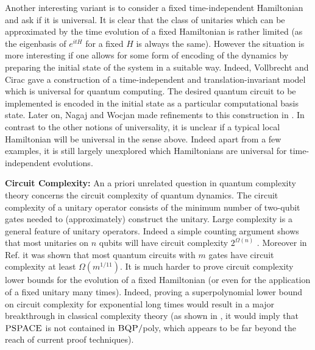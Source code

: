 \documentclass[11pt,letterpaper]{article}
\newcommand{\<}{\langle}
\renewcommand{\>}{\rangle}
\begin{document}
Another interesting variant is to consider a fixed time-independent Hamiltonian and ask if it is universal. It is clear that the class of unitaries which can be approximated by the time evolution of a fixed Hamiltonian is rather limited (as the eigenbasis of $e^{i t H}$ for a fixed $H$ is always the same). However the situation is more interesting if one allows for some form of encoding of the dynamics by preparing the initial state of the system in a suitable way. Indeed, Vollbrecht and Cirac \cite{VC} gave a construction of a time-independent and translation-invariant model which is universal for quantum computing. The desired quantum circuit to be implemented is encoded in the initial state as a particular computational basis state. Later on, Nagaj and Wocjan made refinements to this construction in \cite{NW}. In contrast to the other notions of universality, it is unclear if a typical local Hamiltonian will be universal in the sense above. Indeed apart from a few examples, it is still largely unexplored which Hamiltonians are universal for time-independent evolutions. 

\vspace{0.2 cm}

\noindent \textbf{Circuit Complexity:} An a priori unrelated question in quantum complexity theory concerns the circuit complexity of quantum dynamics. The circuit complexity of a unitary operator consists of the minimum number of two-qubit gates needed to (approximately) construct the unitary. Large complexity is a general feature of unitary operators. Indeed a simple counting argument shows that most unitaries on $n$ qubits will have circuit complexity $2^{\Omega(n)}$ \cite{AB}. Moreover in Ref. \cite{brandao2012local} it was shown that most quantum circuits with $m$ gates have circuit complexity at least $\Omega(m^{1/11})$. It is much harder to prove circuit complexity lower bounds for the evolution of a fixed Hamiltonian (or even for the application of a fixed unitary many times). Indeed, proving a superpolynomial lower bound on circuit complexity for exponential long times would result in a major breakthrough in classical complexity theory (as shown in \cite{AB}, it would imply that $\textsc{PSPACE}$ is not contained in $\textsc{BQP}/$poly, which appears to be far beyond the reach of current proof techniques). 
\end{document}
